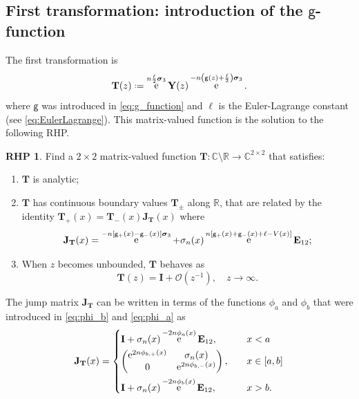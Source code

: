 \documentclass[reqno,a4paper,11pt]{amsart}
\DeclareMathOperator{\ee}{\rm e}
\newcommand{\C}{\mathbb{C}}
\newcommand{\R}{\mathbb{R}}
\newcommand{\Boh}{\mathcal{O}}
\renewcommand{\bm}{\mathbf}
\newcommand{\msf}{\mathsf}
\renewcommand{\sp}{\boldsymbol \sigma}
\theoremstyle{definition}
\newtheorem{rhp}[theorem]{RHP}
\theoremstyle{remark}
\numberwithin{equation}{section}
\newcommand*{\defeq}{\mathrel{\vcenter{\baselineskip0.5ex \lineskiplimit0pt
                     \hbox{\scriptsize.}\hbox{\scriptsize.}}}%
                     =}
\begin{document}
\subsection{First transformation: introduction of the \texorpdfstring{$\msf g$}{g}-function}\hfill 

    The first transformation is 
    \[
       \bm T(z) \defeq \ee^{n\frac{\ell }{2} \sp_3} \bm Y(z) \ee^{-n\left(\msf g(z) + \frac{\ell}{2}\right) \sp_3}.
    \]
    where $\msf g$ was introduced in \eqref{eq:g_function} and $\ell$ is the Euler-Lagrange constant (see \eqref{eq:EulerLagrange}).
    This matrix-valued function is the solution to the following RHP.
    \begin{rhp}\label{rhp:T}
        Find a $2 \times 2$ matrix-valued function $\bm T:\C \setminus \R \to \C^{2 \times 2}$ that satisfies:
        \begin{enumerate}[\rm (i)]
            \item $\bm T$ is analytic;
            \item $\bm T$ has continuous boundary values $\bm T_{\pm}$ along $\R$, that are related by the identity $\bm T_+(x) = \bm T_-(x) \bm J_{\bm T}(x)$ where
            \[
                \bm J_{\bm T}(x) = 
                    \ee^{-n[\msf g_+(x) - \msf g_-(x)] \sp_3} + \sigma_n(x) \ee^{n[\msf g_+(x) + \msf g_-(x) + \ell - V(x)]}\bm E_{12}
                ;
            \]
            \item When $z$ becomes unbounded, $\bm T$ behaves as 
            \[
                \bm T(z) = \bm I +   \Boh \left( z^{-1}\right), \quad z\to \infty.
            \]
        \end{enumerate}
    \end{rhp}

    The jump matrix $\bm J_{\bm T}$ can be written in terms of the functions $\phi_a$ and $\phi_b$ that were introduced in \eqref{eq:phi_b} and \eqref{eq:phi_a} as
    \[
        \bm J_{\bm T}(x) = 
            \begin{dcases}
                \bm I + \sigma_n(x) \ee^{-2n \phi_a(x)}\bm E_{12}, \quad &x < a \\
                \begin{pmatrix}
                    \ee^{2n \phi_{b,+}(x)} & \sigma_n(x)  \\
                    0   &   \ee^{2 n \phi_{b,-}(x)}
                \end{pmatrix}, \quad &x \in [a,b] \\
                \bm I + \sigma_n(x) \ee^{-2n \phi_b(x)}\bm E_{12}, \quad &x > b.
            \end{dcases}
    \]
\end{document}
